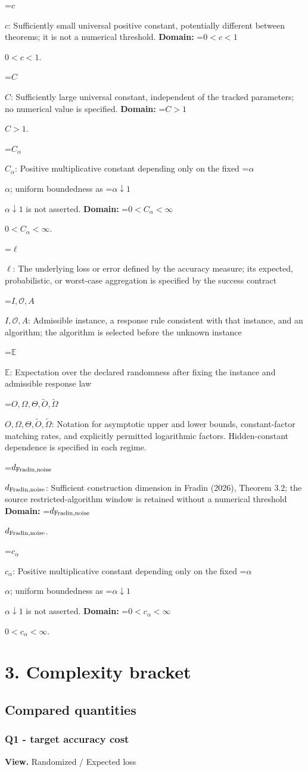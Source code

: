 \documentclass[10pt,a4paper]{article}
\newcommand{\AtlasMath}[1]{\par\begingroup\centering\setbox0=\hbox{$\displaystyle #1$}\ifdim\wd0>1.4\linewidth\typeout{ATLAS WIDE FORMULA: \the\wd0}\fi\ifdim\wd0>\linewidth\resizebox{\linewidth}{!}{\box0}\else\box0\fi\par\endgroup}
\newcommand{\AtlasInlineMath}[1]{\begingroup\setbox0=\hbox{$#1$}\ifdim\wd0>.4\linewidth\endgroup\AtlasMath{#1}\else\endgroup$#1$\fi}
\begin{document}
\AtlasInlineMath{c}: Sufficiently small universal positive constant, potentially different between theorems; it is not a numerical threshold. \textbf{Domain:} \AtlasInlineMath{0<c<1}.

\AtlasInlineMath{C}: Sufficiently large universal constant, independent of the tracked parameters; no numerical value is specified. \textbf{Domain:} \AtlasInlineMath{C>1}.

\AtlasInlineMath{C_\alpha}: Positive multiplicative constant depending only on the fixed \AtlasInlineMath{\alpha}; uniform boundedness as \AtlasInlineMath{\alpha\downarrow1} is not asserted. \textbf{Domain:} \AtlasInlineMath{0<C_\alpha<\infty}.

\AtlasInlineMath{\ell}: The underlying loss or error defined by the accuracy measure; its expected, probabilistic, or worst-case aggregation is specified by the success contract

\AtlasInlineMath{I,\mathcal{O},A}: Admissible instance, a response rule consistent with that instance, and an algorithm; the algorithm is selected before the unknown instance

\AtlasInlineMath{\mathbb{E}}: Expectation over the declared randomness after fixing the instance and admissible response law

\AtlasInlineMath{O,\Omega,\Theta,\widetilde{O},\widetilde\Omega}: Notation for asymptotic upper and lower bounds, constant-factor matching rates, and explicitly permitted logarithmic factors. Hidden-constant dependence is specified in each regime.

\AtlasInlineMath{d_{\rm Fradin,noise}}: Sufficient construction dimension in Fradin (2026), Theorem 3.2; the source restricted-algorithm window is retained without a numerical threshold \textbf{Domain:} \AtlasInlineMath{d_{\rm Fradin,noise}}.

\AtlasInlineMath{c_\alpha}: Positive multiplicative constant depending only on the fixed \AtlasInlineMath{\alpha}; uniform boundedness as \AtlasInlineMath{\alpha\downarrow1} is not asserted. \textbf{Domain:} \AtlasInlineMath{0<c_\alpha<\infty}.

\section{3. Complexity bracket}
\subsection{Compared quantities}
\subsubsection{Q1 - target accuracy cost}
\textbf{View.} Randomized / Expected loss
\end{document}
